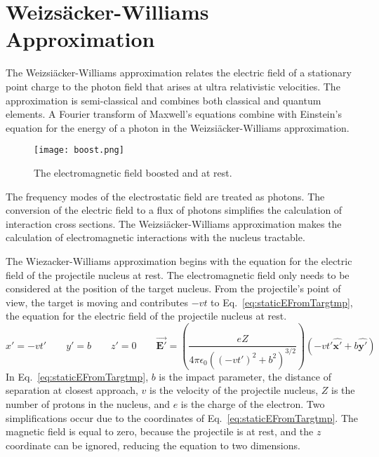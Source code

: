   \section{Weizs\"{a}cker-Williams Approximation}
    The Weizsi\"{a}cker-Williams approximation relates the electric field of a 
      stationary point charge to the photon field that arises at ultra 
      relativistic velocities. 
    The approximation is semi-classical and combines both classical and quantum 
      elements.
    A Fourier transform of Maxwell's equations combine with Einstein's equation 
      for the energy of a photon in the Weizsi\"{a}cker-Williams approximation.
    \begin{wrapfigure}{r}{0.75\textwidth}
      \begin{center}
        \texttt{[image: boost.png]}
      \end{center}
      \caption{ \label{fig:boost} The electromagnetic field boosted and at rest. }
    \end{wrapfigure}
    The frequency modes of the electrostatic field are treated as photons. 
    The conversion of the electric field to a flux of photons simplifies the
      calculation of interaction cross sections. 
    The Weizsi\"{a}cker-Williams approximation makes the calculation of 
      electromagnetic interactions with the nucleus tractable. 

    The Wiezacker-Williams approximation begins with the equation for the 
      electric field of the projectile nucleus at rest. 
    The electromagnetic field only needs to be considered at the position of 
      the target nucleus. 
    From the projectile's point of view, the target is moving and contributes
     $-vt$ to Eq.~\ref{eq:staticEFromTargtmp}, the equation for the electric 
     field of the projectile nucleus at rest.
    \begin{equation} \label{eq:staticEFromTargtmp}
        x'=-vt'\qquad
        y'=b\qquad
        z'=0\qquad
	\vec{\mathbf{E'}}=\left(\frac{eZ}
         {4 \pi \epsilon_{0}\left(\left(-vt'\right)^{2}+b^{2}\right)^{3/2}}\right)
	 \left(-vt'{\mathbf{\hat{x'}}+b\mathbf{\hat{y'}}}\right)
    \end{equation}        
    In Eq.~\ref{eq:staticEFromTargtmp}, $b$ is the impact parameter, 
      the distance of separation at closest approach, $v$ is the velocity of the 
      projectile nucleus, $Z$ is the number of protons in the nucleus, and $e$ 
      is the charge of the electron.
    Two simplifications occur due to the coordinates of 
      Eq.~\ref{eq:staticEFromTargtmp}.
    The magnetic field is equal to zero, because the projectile is at rest, and
      the $z$ coordinate can be ignored, reducing the equation to two dimensions. 

